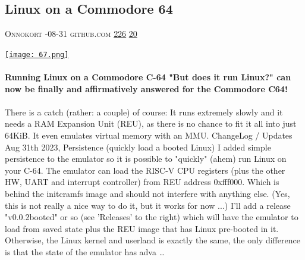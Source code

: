 \documentclass[10pt,a4paper]{article}
\begin{document}
\begin{multicols}{2}
\begin{minipage}{\linewidth}
\subsection{Linux on a Commodore 64}
\textsc{\footnotesize
{\scriptsize\faUser}\space 
Onnokort 
{\scriptsize\faCalendar}-08-31 
{\scriptsize\faGithub}\space 
github.com 
{\scriptsize\faThumbsOUp}\space 
\href{http://news.ycombinator.com/item?id=37277907\&utm\_term=comment}{226} 
{\scriptsize\faComments}\space 
\href{http://news.ycombinator.com/item?id=37277907\&utm\_term=comment}{20} 
}
\par\medskip\noindent
\href{https://github.com/onnokort/semu-c64?utm\_source=hackernewsletter\&utm\_medium=email\&utm\_term=fun}{
    \texttt{[image: 67.png]}
}
\end{minipage}
\paragraph{}
\textbf{Running Linux on a Commodore C-64
"But does it run Linux?" can now be finally and affirmatively answered for the Commodore C64!}
\paragraph{}

There is a catch (rather: a couple) of course: It runs extremely slowly and it needs a RAM Expansion Unit (REU), as there is no chance to fit it all into just 64KiB.
It even emulates virtual memory with an MMU.
ChangeLog / Updates
Aug 31th 2023, Persistence (quickly load a booted Linux)
I added simple persistence to the emulator so it is possible to "quickly" (ahem) run Linux on your C-64.
The emulator can load the RISC-V CPU registers (plus the other HW, UART and interrupt controller) from REU address 0xfff000. Which is behind the initcramfs image and should not interfere with anything else. (Yes, this is not really a nice way to do it, but it works for now ...)
I'll add a release "v0.0.2booted" or so (see 'Releases' to the right) which will have the emulator to load from saved state plus the REU image that has Linux pre-booted in it.
Otherwise, the Linux kernel and userland is exactly the same, the only difference is that the state of the emulator has adva
\dots\par
\noindent\begin{minipage}{\linewidth}
\medskip

\end{minipage}
\end{multicols}
\end{document}
